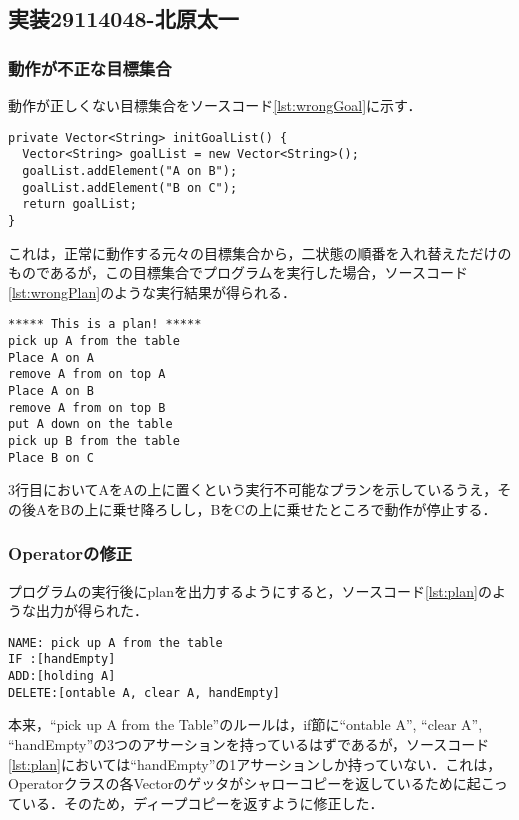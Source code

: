 \documentclass{jarticle}
\begin{document}
\subsection{実装29114048-北原太一}
\subsubsection{動作が不正な目標集合}
動作が正しくない目標集合をソースコード\ref{lst:wrongGoal}に示す．
  \begin{lstlisting}[caption=Planner.java(一部抜粋),label=lst:wrongGoal]
private Vector<String> initGoalList() {
  Vector<String> goalList = new Vector<String>();
  goalList.addElement("A on B");
  goalList.addElement("B on C");
  return goalList;
}
  \end{lstlisting}
  
これは，正常に動作する元々の目標集合から，二状態の順番を入れ替えただけのものであるが，この目標集合でプログラムを実行した場合，ソースコード\ref{lst:wrongPlan}のような実行結果が得られる．
\begin{lstlisting}[caption=実行例(抜粋),label=lst:wrongPlan]
***** This is a plan! *****
pick up A from the table
Place A on A
remove A from on top A
Place A on B
remove A from on top B
put A down on the table
pick up B from the table
Place B on C
\end{lstlisting}

3行目においてAをAの上に置くという実行不可能なプランを示しているうえ，その後AをBの上に乗せ降ろしし，BをCの上に乗せたところで動作が停止する．

\subsubsection{Operatorの修正}
\label{sec:1Operator}
プログラムの実行後にplanを出力するようにすると，ソースコード\ref{lst:plan}のような出力が得られた．
\begin{lstlisting}[caption=実行例(抜粋),label=lst:plan]
NAME: pick up A from the table
IF :[handEmpty]
ADD:[holding A]
DELETE:[ontable A, clear A, handEmpty]
\end{lstlisting}

本来，``pick up A from the Table''のルールは，if節に``ontable A'', ``clear A'', ``handEmpty''の3つのアサーションを持っているはずであるが，ソースコード\ref{lst:plan}においては``handEmpty''の1アサーションしか持っていない．これは，Operatorクラスの各Vectorのゲッタがシャローコピーを返しているために起こっている．そのため，ディープコピーを返すように修正した．
\end{document}
